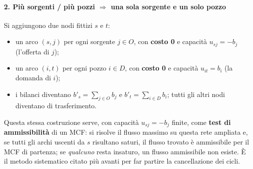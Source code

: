 \documentclass[12pt]{extarticle} %
\begin{document}
\paragraph{2. Più sorgenti / più pozzi $\Rightarrow$ una sola sorgente e un solo pozzo}
Si aggiungono due nodi fittizi $s$ e $t$:
\begin{itemize}
    \item un arco $(s,j)$ per ogni sorgente $j \in O$, con \textbf{costo 0} e capacità $u_{sj} = -b_j$ (l'offerta di $j$);
    \item un arco $(i,t)$ per ogni pozzo $i \in D$, con \textbf{costo 0} e capacità $u_{it} = b_i$ (la domanda di $i$);
    \item i bilanci diventano $b'_s = \sum_{j \in O} b_j$ e $b'_t = \sum_{i \in D} b_i$; tutti gli altri nodi diventano di trasferimento.
\end{itemize}
\begin{center}
\end{center}
Questa stessa costruzione serve, con capacità $u_{sj}=-b_j$ finite, come \textbf{test di ammissibilità} di un MCF: si risolve il flusso massimo su questa rete ampliata e, se tutti gli archi uscenti da $s$ risultano saturi, il flusso trovato è ammissibile per il MCF di partenza; se \emph{qualcuno} resta insaturo, un flusso ammissibile non esiste. È il metodo sistematico citato più avanti per far partire la cancellazione dei cicli.
\end{document}
